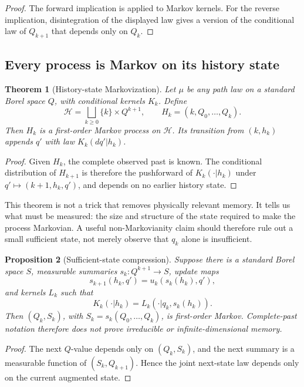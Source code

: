 \documentclass[11pt]{article}
\newtheorem{theorem}{Theorem}[section]
\newtheorem{proposition}[theorem]{Proposition}
\theoremstyle{definition}
\theoremstyle{remark}
\newcommand{\cH}{\mathcal{H}}
\begin{document}
\begin{proof}
The forward implication is  applied to Markov kernels.  For the
reverse implication, disintegration of the displayed law gives a version of
the conditional law of \(Q_{k+1}\) that depends only on \(Q_k\).
\end{proof}

\subsection{Every process is Markov on its history state}

\begin{theorem}[History-state Markovization]\label{thm:history-markov}
Let \(\mu\) be any path law on a standard Borel space \(Q\), with conditional
kernels \(K_k\).  Define
\[
\cH=\bigsqcup_{k\geq0}\{k\}\times Q^{k+1},
\qquad
H_k=(k,Q_0,\ldots,Q_k).
\]
Then \(H_k\) is a first-order Markov process on \(\cH\).  Its transition from
\((k,h_k)\) appends \(q'\) with law \(K_k(dq'|h_k)\).
\end{theorem}

\begin{proof}
Given \(H_k\), the complete observed past is known.  The conditional
distribution of \(H_{k+1}\) is therefore the pushforward of
\(K_k(\cdot|h_k)\) under
\(q'\mapsto(k+1,h_k,q')\), and depends on no earlier history state.
\end{proof}

This theorem is not a trick that removes physically relevant memory.  It tells
us what must be measured: the size and structure of the state required to make
the process Markovian.  A useful non-Markovianity claim should therefore rule
out a small sufficient state, not merely observe that \(q_k\) alone is
insufficient.

\begin{proposition}[Sufficient-state compression]\label{prop:sufficient}
Suppose there is a standard Borel space \(S\), measurable summaries
\(s_k:Q^{k+1}\to S\), update maps
\[
s_{k+1}(h_k,q')=u_k(s_k(h_k),q'),
\]
and kernels \(L_k\) such that
\[
K_k(\cdot|h_k)=L_k(\cdot|q_k,s_k(h_k)).
\]
Then \((Q_k,S_k)\), with \(S_k=s_k(Q_0,\ldots,Q_k)\), is first-order Markov.
Complete-past notation therefore does not prove irreducible or
infinite-dimensional memory.
\end{proposition}

\begin{proof}
The next \(Q\)-value depends only on \((Q_k,S_k)\), and the next summary is a
measurable function of \((S_k,Q_{k+1})\).  Hence the joint next-state law
depends only on the current augmented state.
\end{proof}
\end{document}
